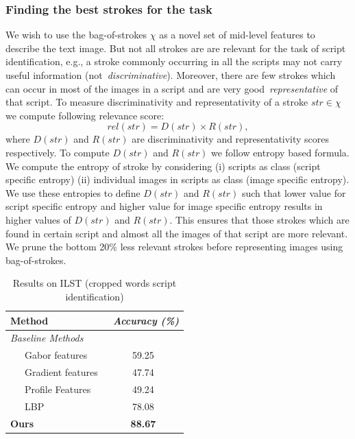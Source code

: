 \subsubsection{Finding the best strokes for the task}
\label{sec:best}
We wish to use the bag-of-strokes $\chi$ as a novel set of mid-level
features to describe the text image. But not all strokes are
are relevant for the task of script identification, e.g., 
a stroke commonly occurring in all the scripts may not carry
useful information (not~\emph{discriminative}). Moreover, there 
are few strokes which can occur in most of the images in a script 
and are very good~\emph{representative} of that script. To measure
discriminativity and representativity of a stroke $str \in \chi$  we compute following relevance score:
\begin{equation}
rel(str) = D(str) \times R(str),
\end{equation}
where $D(str)$ and $R(str)$ are discriminativity and representativity scores respectively. To compute $D(str)$ and $R(str)$ we follow entropy based formula.
We compute the entropy of stroke by considering (i) scripts as class (script specific entropy) (ii) individual images in scripts as class (image specific entropy). We use these entropies to define $D(str)$ and $R(str)$ such that lower value for script specific entropy and higher value for image specific entropy results in higher values of $D(str)$ and $R(str)$. This ensures that those strokes which are found in certain script and almost all the images of that script are more relevant. We prune the bottom 20\% less relevant strokes before representing images using bag-of-strokes. 

\begin{table}[!t]
\caption{Results on ILST (cropped words script identification)} 
\centering
\renewcommand{\arraystretch}{1.5}
\begin{tabular}{|l|c|}
  \hline              
  \textbf{Method} &~\emph{\textbf{Accuracy} (\%)}   \\      
  \hline\hline
\textit{Baseline Methods} & \\
~~~Gabor features~\cite{Pati} & 59.25 \\ 
~~~Gradient features & 47.74 \\ 
~~~Profile Features~\cite{Manmatha12} & 49.24 \\
~~~LBP~\cite{LBPOjala2002} & 78.08\\
\hline\hline
\textbf{Ours} & \textbf{88.67} \\
  \hline  
\end{tabular}
\label{tab:ILSTRes1} 
\end{table}

